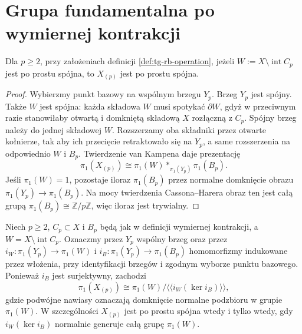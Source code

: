 \section{Grupa fundamentalna po wymiernej kontrakcji}
\label{sec:tg-rb-pi1}

\begin{stwierdzenie}
\label{prop:tg-rb-pi1}
Dla $p\geq2$, przy założeniach definicji
\ref{def:tg-rb-operation},
jeżeli $W:=X\setminus\operatorname{int}C_p$ jest
po prostu spójna, to $X_{(p)}$ jest po prostu spójna.
\end{stwierdzenie}

\begin{proof}
Wybierzmy punkt bazowy na wspólnym brzegu $Y_p$.
Brzeg $Y_p$ jest spójny. Także $W$ jest spójna:
każda składowa $W$ musi spotykać $\partial W$,
gdyż w przeciwnym razie stanowiłaby otwartą
i domkniętą składową $X$ rozłączną z $C_p$.
Spójny brzeg należy do jednej składowej $W$.
Rozszerzamy oba składniki przez otwarte kołnierze,
tak aby ich przecięcie retraktowało się na $Y_p$,
a same rozszerzenia na odpowiednio $W$ i $B_p$.
Twierdzenie van Kampena daje prezentację
\[
\pi_1(X_{(p)})\cong\pi_1(W)*_{\pi_1(Y_p)}\pi_1(B_p).
\]
Jeśli $\pi_1(W)=1$, pozostaje iloraz
$\pi_1(B_p)$ przez normalne domknięcie obrazu
$\pi_1(Y_p)\to\pi_1(B_p)$. Na mocy twierdzenia
Cassona--Harera obraz ten jest całą grupą
$\pi_1(B_p)\cong\mathbb Z/p\mathbb Z$,
więc iloraz jest trywialny.
\end{proof}

\begin{stwierdzenie}
\label{prop:tg-rb-pi1-general}
Niech $p\ge2$, $C_p\subset X$ i $B_p$
będą jak w definicji wymiernej kontrakcji,
a $W=X\setminus\operatorname{int}C_p$.
Oznaczmy przez $Y_p$ wspólny brzeg oraz
przez $i_W\colon\pi_1(Y_p)\to\pi_1(W)$
i $i_B\colon\pi_1(Y_p)\to\pi_1(B_p)$
homomorfizmy indukowane przez włożenia,
przy identyfikacji brzegów i zgodnym
wyborze punktu bazowego.
Ponieważ $i_B$ jest surjektywny, zachodzi
\[
\pi_1(X_{(p)})\cong
\pi_1(W)\big/
\big\langle\!\big\langle
i_W(\ker i_B)
\big\rangle\!\big\rangle,
\]
gdzie podwójne nawiasy oznaczają
domknięcie normalne podzbioru
w grupie $\pi_1(W)$.
W szczególności $X_{(p)}$ jest
po prostu spójna wtedy i tylko wtedy, gdy
$i_W(\ker i_B)$ normalnie generuje
całą grupę $\pi_1(W)$.
\end{stwierdzenie}

